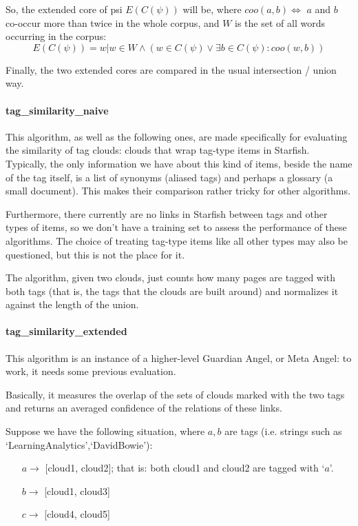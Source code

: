 \documentclass[11pt]{article}
\begin{document}
So, the extended core of psi $E(C(\psi))$ will be, where $coo(a,b) \iff$ $a$ and $b$ co-occur more than twice in the whole corpus, and $W$ is the set of all words occurring in the corpus:
\[E(C(\psi)) = {w | w \in W \land (w \in C(\psi)\lor \exists b \in C(\psi) : coo(w,b)) }\]

Finally, the two extended cores are compared in the usual intersection / union way.


\paragraph{tag\_similarity\_naive}

This algorithm, as well as the following ones, are made specifically for evaluating the similarity of tag clouds: clouds that wrap tag-type items in Starfish. Typically, the only information we have about this kind of items, beside the name of the tag itself, is a list of synonyms (aliased tags) and perhaps a glossary (a small document). This makes their comparison rather tricky for other algorithms.

Furthermore, there currently are no links in Starfish between tags and other types of items, so we don't have a training set to assess the performance of these algorithms. The choice of treating tag-type items like all other types may also be questioned, but this is not the place for it.

The algorithm, given two clouds, just counts how many pages are tagged with both tags (that is, the tags that the clouds are built around) and normalizes it against the length of the union.

\paragraph{tag\_similarity\_extended}

This algorithm is an instance of a higher-level Guardian Angel, or Meta Angel: to work, it needs some previous evaluation.

Basically, it measures the overlap of the sets of clouds marked with the two tags and returns an averaged confidence of the relations of these links.

Suppose we have the following situation, where $a,b$ are tags (i.e. strings such as `LearningAnalytics',`DavidBowie'):
\begin{enumerate}			
\item[$a\to$] [cloud1, cloud2]; that is: both cloud1 and cloud2 are tagged with `$a$'.
\item[$b\to$] [cloud1, cloud3]
\item[$c\to$] [cloud4,	cloud5]
\end{enumerate}
\end{document}
